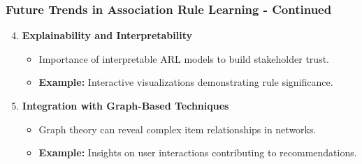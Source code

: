 \documentclass{beamer}
\begin{document}
\begin{frame}[fragile]
    \frametitle{Future Trends in Association Rule Learning - Continued}
    \begin{enumerate}
        \setcounter{enumi}{3} %
        \item \textbf{Explainability and Interpretability}
        \begin{itemize}
            \item Importance of interpretable ARL models to build stakeholder trust.
            \item \textbf{Example:} Interactive visualizations demonstrating rule significance.
        \end{itemize}
        
        \item \textbf{Integration with Graph-Based Techniques}
        \begin{itemize}
            \item Graph theory can reveal complex item relationships in networks.
            \item \textbf{Example:} Insights on user interactions contributing to recommendations.
        \end{itemize}
    \end{enumerate}
\end{frame}
\end{document}
